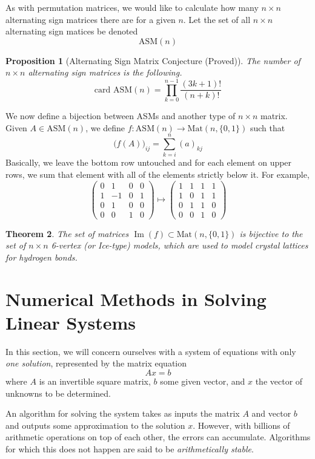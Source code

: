 \documentclass{article}
\DeclareMathOperator{\im}{Im}
\newtheorem{theorem}{Theorem}[section]
\newtheorem{proposition}[theorem]{Proposition}
\theoremstyle{remark}
\theoremstyle{definition}
\begin{document}
    As with permutation matrices, we would like to calculate how many $n \times n$ alternating sign matrices there are for a given $n$. Let the set of all $n \times n$ alternating sign matices be denoted
    \[\text{ASM}(n)\]

    \begin{proposition}[Alternating Sign Matrix Conjecture (Proved)]
    The number of $n \times n$ alternating sign matrices is the following. 
    \[\text{card ASM}(n) = \prod_{k=0}^{n-1} \frac{(3k+1)!}{(n+k)!}\]
    \end{proposition}

    We now define a bijection between ASMs and another type of $n \times n$ matrix. Given $A \in \text{ASM}(n)$, we define $f: \text{ASM}(n) \longrightarrow \text{Mat}(n, \{0,1\})$ such that
    \[\big(f(A)\big)_{ij} = \sum_{k=i}^n (a)_{kj}\]
    Basically, we leave the bottom row untouched and for each element on upper rows, we sum that element with all of the elements strictly below it. For example, 
    \[\begin{pmatrix}
    0&1&0&0\\1&-1&0&1\\0&1&0&0\\0&0&1&0
    \end{pmatrix} \mapsto \begin{pmatrix}
    1&1&1&1\\1&0&1&1\\0&1&1&0\\0&0&1&0
    \end{pmatrix}\]

    \begin{theorem}
    The set of matrices $\im(f) \subset \text{Mat}(n, \{0, 1\})$ is bijective to the set of $n \times n$ 6-vertex (or Ice-type) models, which are used to model crystal lattices for hydrogen bonds. 
    \end{theorem}

\section{Numerical Methods in Solving Linear Systems}

  In this section, we will concern ourselves with a system of equations with only \textit{one solution}, represented by the matrix equation
  \[A x = b\]
  where $A$ is an invertible square matrix, $b$ some given vector, and $x$ the vector of unknowns to be determined. 

  An algorithm for solving the system takes as inputs the matrix $A$ and vector $b$ and outputs some approximation to the solution $x$. However, with billions of arithmetic operations on top of each other, the errors can accumulate. Algorithms for which this does not happen are said to be \textit{arithmetically stable}. 
\end{document}
